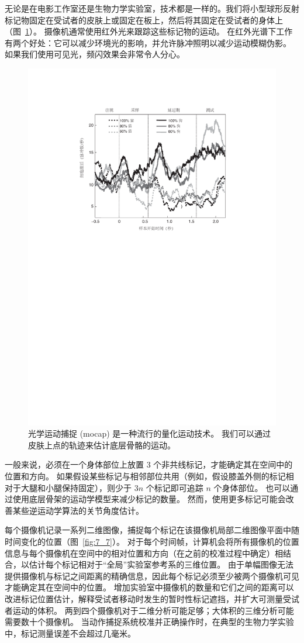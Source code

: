 无论是在电影工作室还是生物力学实验室，技术都是一样的。我们将小型球形反射标记物固定在受试者的皮肤上或固定在板上，然后将其固定在受试者的身体上（图~\ref{fig:7_6}）。
摄像机通常使用红外光来跟踪这些标记物的运动。
在红外光谱下工作有两个好处：它可以减少环境光的影响，并允许脉冲照明以减少运动模糊伪影。
如果我们使用可见光，频闪效果会非常令人分心。


\begin{figure}[!htb]
	\centering
	\includegraphics[width=0.5\linewidth]{chap7/7_6}
	\caption{光学运动捕捉 (mocap) 是一种流行的量化运动技术。
		我们可以通过皮肤上点的轨迹来估计底层骨骼的运动。 \label{fig:7_6}}
\end{figure}


一般来说，必须在一个身体部位上放置 3 个非共线标记，才能确定其在空间中的位置和方向。
如果假设某些标记与相邻部位共用（例如，假设膝盖外侧的标记相对于大腿和小腿保持固定），则少于 $3n$ 个标记即可追踪 $n$ 个身体部位。
也可以通过使用底层骨架的运动学模型来减少标记的数量。
然而，使用更多标记可能会改善某些逆运动学算法的关节角度估计。


每个摄像机记录一系列二维图像，捕捉每个标记在该摄像机局部二维图像平面中随时间变化的位置（图~\ref{fig:7_7}）。
对于每个时间帧，计算机会将所有摄像机的位置信息与每个摄像机在空间中的相对位置和方向（在之前的校准过程中确定）相结合，以估计每个标记相对于“全局”实验室参考系的三维位置。
由于单幅图像无法提供摄像机与标记之间距离的精确信息，因此每个标记必须至少被两个摄像机可见才能确定其在空间中的位置。
增加实验室中摄像机的数量和它们之间的距离可以改进标记位置估计，解释受试者移动时发生的暂时性标记遮挡，并扩大可测量受试者运动的体积。
两到四个摄像机对于二维分析可能足够；大体积的三维分析可能需要数十个摄像机。
当动作捕捉系统校准并正确操作时，在典型的生物力学实验中，标记测量误差不会超过几毫米。


